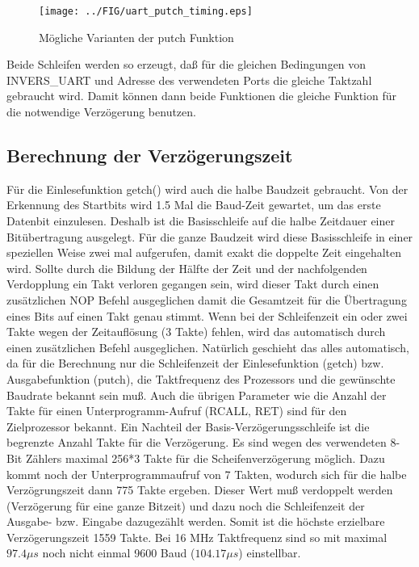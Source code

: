 \begin{figure}[H]
\centering
\texttt{[image: ../FIG/uart\_putch\_timing.eps]}
\caption{Mögliche Varianten der putch Funktion}
\label{fig:putch_timing}
\end{figure}

Beide Schleifen werden so erzeugt, daß für die gleichen Bedingungen von INVERS\_UART und Adresse des verwendeten
Ports die gleiche Taktzahl gebraucht wird. Damit können dann beide Funktionen die gleiche
Funktion für die notwendige Verzögerung benutzen.

\subsection{Berechnung der Verzögerungszeit}
Für die Einlesefunktion getch() wird auch die halbe Baudzeit  gebraucht.
Von der Erkennung des Startbits wird 1.5 Mal die Baud-Zeit gewartet, um das erste Datenbit
einzulesen.
Deshalb ist die Basisschleife auf die halbe Zeitdauer einer Bitübertragung ausgelegt.
Für die ganze Baudzeit wird diese Basisschleife in einer speziellen Weise zwei mal aufgerufen,
damit exakt die doppelte Zeit eingehalten wird. Sollte durch die Bildung der Hälfte der Zeit und der
nachfolgenden Verdopplung ein Takt verloren gegangen sein, wird dieser Takt durch einen zusätzlichen
NOP Befehl ausgeglichen damit die Gesamtzeit für die Übertragung eines Bits auf einen Takt genau stimmt.
Wenn bei der Schleifenzeit ein oder zwei Takte wegen der Zeitauflösung (3 Takte) fehlen,
wird das automatisch durch einen zusätzlichen Befehl ausgeglichen.
Natürlich geschieht das alles automatisch, da für die Berechnung nur die Schleifenzeit der Einlesefunktion
(getch) bzw. Ausgabefunktion (putch), die Taktfrequenz des Prozessors und die gewünschte Baudrate
bekannt sein muß. Auch die übrigen Parameter wie die Anzahl der Takte für einen Unterprogramm-Aufruf
(RCALL, RET) sind für den Zielprozessor bekannt.
Ein Nachteil der Basis-Verzögerungsschleife ist die begrenzte Anzahl Takte für die Verzögerung.
Es sind wegen des verwendeten 8-Bit Zählers maximal 256*3 Takte für die Scheifenverzögerung möglich.
Dazu kommt noch der Unterprogrammaufruf von 7 Takten, wodurch sich für die halbe Verzögrungszeit dann 775 Takte ergeben.
Dieser Wert muß verdoppelt werden (Verzögerung für eine ganze Bitzeit) und dazu noch die Schleifenzeit der
Ausgabe- bzw. Eingabe dazugezählt werden. Somit ist die höchste erzielbare Verzögerungszeit 1559 Takte.
Bei 16 MHz Taktfrequenz sind so mit maximal \(97.4\mu s\) noch nicht einmal 9600 Baud (\(104.17 \mu s\)) einstellbar.
